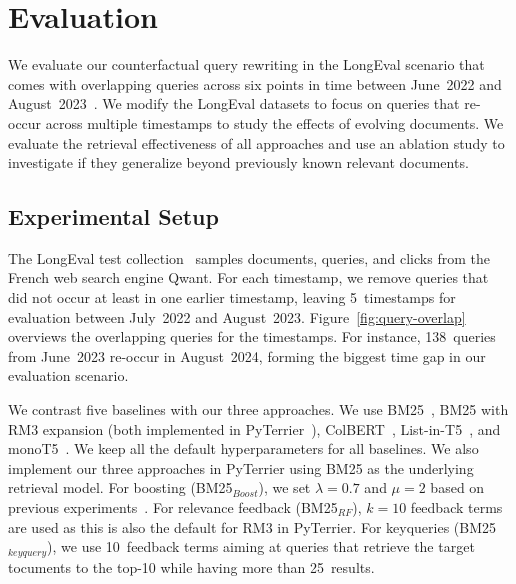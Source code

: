 \section{Evaluation}

We evaluate our counterfactual query rewriting in the LongEval scenario that comes with overlapping queries across six points in time between June~2022 and August~2023~\cite{alkhalifa:2023,alkhalifa:2024,galuscakova:2023}. We modify the LongEval datasets to focus on queries that re-occur across multiple timestamps to study the effects of evolving documents. We evaluate the retrieval effectiveness of all approaches and use an ablation study to investigate if they generalize beyond previously known relevant documents.

\subsection{Experimental Setup}
The LongEval test collection~\cite{galuscakova:2023} samples documents, queries, and clicks from the French web search engine Qwant. For each timestamp, we remove queries that did not occur at least in one earlier timestamp, leaving 5~time\-stamps for evaluation between July~2022 and August~2023. %
Figure~\ref{fig:query-overlap} overviews the overlapping queries for the timestamps. For instance, 138~queries from June~2023 re-occur in August~2024, forming the biggest time gap in our evaluation scenario.

We contrast five baselines with our three approaches. We use BM25~\cite{robertson:1994}, BM25 with RM3 expansion (both implemented in PyTerrier~\cite{macdonald:2020}), ColBERT~\cite{khattab:2020}, List-in-T5~\cite{tamber:2023}, and monoT5~\cite{nogueira:2020}. We keep all the default hyperparameters for all baselines. We also implement our three approaches in PyTerrier using BM25 as the underlying retrieval model. For boosting (BM25$_{Boost}$), we set $\lambda=0.7$ and $\mu=2$ based on previous experiments~\cite{keller:2024b}. For relevance feedback (BM25$_{RF}$), $k=10$ feedback terms are used as this is also the default for RM3 in PyTerrier. For keyqueries (BM25$_{keyquery}$), we use 10~feedback terms aiming at queries that retrieve the target tocuments to the top-10 while having more than 25~results.



